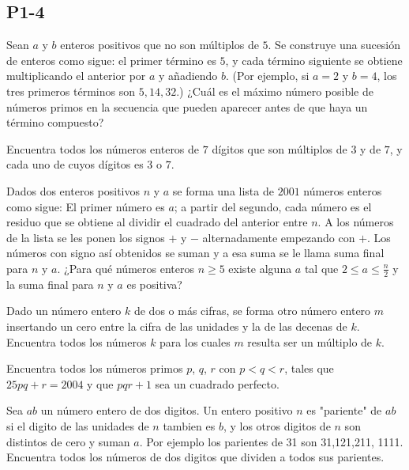 \documentclass[11pt]{scrartcl}
\begin{document}
\subsection{P1-4}
\begin{problem}[2000/4]
    Sean $a$ y $b$ enteros positivos que no son múltiplos de $5$. Se construye una sucesión de enteros como sigue: el primer término es $5$, y cada término siguiente se obtiene multiplicando el anterior por $a$ y añadiendo $b$. (Por ejemplo, si $a = 2$ y $b = 4$, los tres primeros términos son $5,14,32$.) ¿Cuál es el máximo número posible de números primos en la secuencia que pueden aparecer antes de que haya un término compuesto? 
\end{problem}
\begin{problem} [2001/1]
    Encuentra todos los números enteros de $7$ dígitos que son múltiplos de $3$ y de $7$, y cada uno de cuyos dígitos es $3$ o $7$.
\end{problem}
\begin{problem} [2001/4]
    Dados dos enteros positivos $n$ y $a$ se forma una lista de $2001$ números enteros como sigue: El primer número es $a$; a partir del segundo, cada número es el residuo que se obtiene al dividir el cuadrado del anterior entre $n$. A los números de la lista se les ponen los signos $+$ y $-$ alternadamente empezando con $+$. Los números con signo así obtenidos se suman y a esa suma se le llama suma final para $n$ y $a$. ¿Para qué números enteros $n\geq 5$ existe alguna $a$ tal que $2\leq a \leq \frac{n}{2}$ y la suma final para $n$ y $a$ es positiva?
\end{problem}
\begin{problem}[2003/1]
    Dado un número entero $k$ de dos o más cifras, se forma otro número entero $m$ insertando un cero entre la cifra de las unidades y la de las decenas de $k$. Encuentra todos los números $k$ para los cuales $m$ resulta ser un múltiplo de $k$.
\end{problem}
\begin{problem} [2004/1]
    
    Encuentra todos los números primos $p$, $q$, $r$ con $p< q< r$, tales que $25pq+r=2004$ y que $pqr+1$ sea un cuadrado perfecto.
\end{problem}
\begin{problem}
    [2006/1]
    Sea $ab$ un número entero de dos digitos. Un entero positivo $n$ es "pariente" de $ab$ si el digito de las unidades de $n$ tambien es $b$, y los otros digitos de $n$ son distintos de cero y suman $a$. Por ejemplo los parientes de 31 son 31,121,211, 1111. Encuentra todos los números de dos digitos que dividen a todos sus parientes.
\end{problem}
\end{document}

